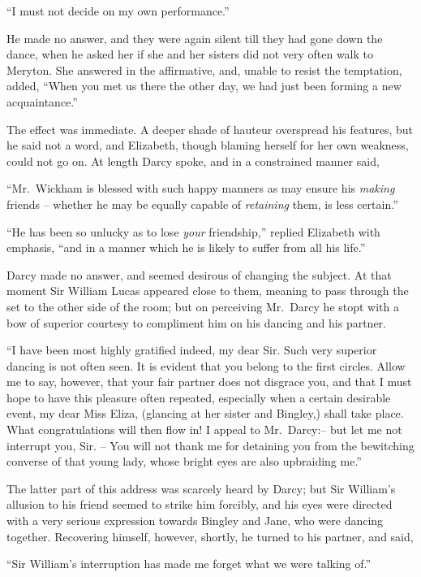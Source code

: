 “I must not decide on my own performance.”

He made no answer, and they were again silent till they
had gone down the dance, when he asked her if she and
her sisters did not very often walk to Meryton. She
answered in the affirmative, and, unable to resist the
temptation, added, “When you met us there the other
day, we had just been forming a new acquaintance.”

The effect was immediate. A deeper shade of hauteur
overspread his features, but he said not a word, and
Elizabeth, though blaming herself for her own weakness,
could not go on. At length Darcy spoke, and in a constrained
manner said,

“Mr.\ Wickham is blessed with such happy manners as
may ensure his \textit{making} friends -- whether he may be equally
capable of \textit{retaining} them, is less certain.”

“He has been so unlucky as to lose \textit{your} friendship,”
replied Elizabeth with emphasis, “and in a manner which
he is likely to suffer from all his life.”

Darcy made no answer, and seemed desirous of changing
the subject. At that moment Sir William Lucas appeared
close to them, meaning to pass through the set to the other
side of the room; but on perceiving Mr.\ Darcy he stopt
with a bow of superior courtesy to compliment him on
his dancing and his partner.

“I have been most highly gratified indeed, my dear Sir.
Such very superior dancing is not often seen. It is evident
that you belong to the first circles. Allow me to say,
however, that your fair partner does not disgrace you,
and that I must hope to have this pleasure often repeated,
especially when a certain desirable event, my dear Miss
Eliza, (glancing at her sister and Bingley,) shall take place.
What congratulations will then flow in! I appeal to
Mr.\ Darcy:-- but let me not interrupt you, Sir. -- You will
not thank me for detaining you from the bewitching
converse of that young lady, whose bright eyes are also
upbraiding me.”

The latter part of this address was scarcely heard by
Darcy; but Sir William’s allusion to his friend seemed to
strike him forcibly, and his eyes were directed with a very
serious expression towards Bingley and Jane, who were
dancing together. Recovering himself, however, shortly,
he turned to his partner, and said,

“Sir William’s interruption has made me forget what
we were talking of.”

